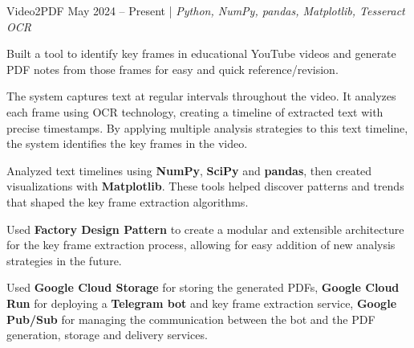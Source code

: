 \resumeSubheadings
{Video2PDF }
{May 2024 -- Present}
{}{}{| \textit{Python, NumPy, pandas, Matplotlib, Tesseract OCR}}
\resumeItemListStart
\item Built a tool to identify key frames in educational YouTube videos and generate PDF notes from those frames for easy and quick reference/revision.
\item The system captures text at regular intervals throughout the video. It analyzes each frame using OCR technology, creating a timeline of extracted text with precise timestamps. By applying multiple analysis strategies to this text timeline, the system identifies the key frames in the video.
\item Analyzed text timelines using \textbf{NumPy}, \textbf{SciPy} and \textbf{pandas}, then created visualizations with \textbf{Matplotlib}. These tools helped discover patterns and trends that shaped the key frame extraction algorithms.
\item Used \textbf{Factory Design Pattern} to create a modular and extensible architecture for the key frame extraction process, allowing for easy addition of new analysis strategies in the future.
\item Used \textbf{Google Cloud Storage} for storing the generated PDFs, \textbf{Google Cloud Run} for deploying a \textbf{Telegram bot} and key frame extraction service, \textbf{Google Pub/Sub} for managing the communication between the bot and the PDF generation, storage and delivery services.
\resumeItemListEnd
